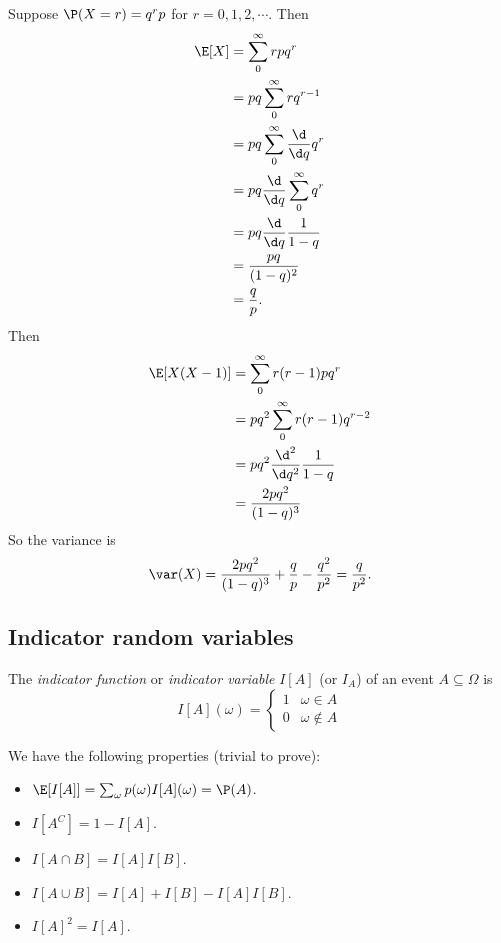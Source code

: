 \documentclass[a4paper]{article}
\begin{document}
\begin{eg}
  Suppose $\P(X = r) = q^r p$ for $r= 0, 1, 2, \cdots$. Then
  \begin{align*}
    \E[X] &= \sum_{0}^\infty rpq^r \\
    &= pq\sum_{0}^\infty rq^{r - 1}\\
    &= pq\sum_{0}^\infty \frac{\d }{\d q}q^r\\
    &= pq\frac{\d }{\d q}\sum_{0}^\infty q^r\\
    &= pq\frac{\d }{\d q}\frac{1}{1 - q}\\
    &= \frac{pq}{(1 - q)^2}\\
    &= \frac{q}{p}.
  \end{align*}
  Then
  \begin{align*}
    \E[X(X - 1)] &= \sum_{0}^\infty r(r - 1)pq^r\\
    &= pq^2 \sum_0^\infty r(r - 1)q^{r - 2}\\
    &= pq^2\frac{\d ^2}{\d q^2}\frac{1}{1 - q}\\
    &= \frac{2pq^2}{(1 - q)^3}\\
  \end{align*}
  So the variance is
  \[
    \var(X) = \frac{2pq^2}{(1 - q)^3}+ \frac{q}{p} - \frac{q^2}{p^2} = \frac{q}{p^2}.
  \]
\end{eg}

\subsection{Indicator random variables}
\begin{defi}
  The \emph{indicator function} or \emph{indicator variable} $I[A]$ (or $I_A$) of an event $A\subseteq \Omega$ is
  \[
    I[A](\omega) =
    \begin{cases}
      1 & \omega\in A\\
      0 & \omega\not\in A
    \end{cases}
  \]
\end{defi}

We have the following properties (trivial to prove):
\begin{prop}\leavevmode
  \begin{itemize}
    \item $\E[I[A]] = \sum_\omega p(\omega) I[A](\omega) = \P(A)$.
    \item $I[A^C] = 1 - I[A]$.
    \item $I[A\cap B] = I[A]I[B]$.
    \item $I[A\cup B] = I[A] + I[B] - I[A]I[B]$.
    \item $I[A]^2 = I[A]$.
  \end{itemize}
\end{prop}
\end{document}
